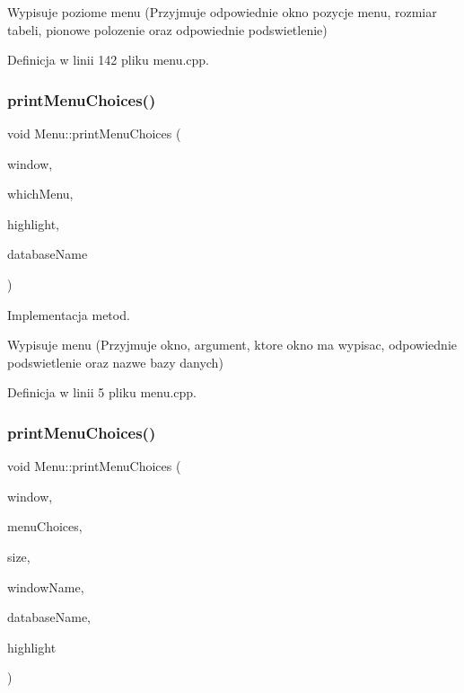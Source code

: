 Wypisuje poziome menu (Przyjmuje odpowiednie okno pozycje menu, rozmiar tabeli, pionowe polozenie oraz odpowiednie podswietlenie) 

Definicja w linii 142 pliku menu.\+cpp.

\mbox{\label{class_menu_ad413f4b72438f65886bc5f5e370ad426}} 
\subsubsection{\texorpdfstring{print\+Menu\+Choices()}{printMenuChoices()}\hspace{0.1cm}{\footnotesize\ttfamily [1/2]}}
{\footnotesize\ttfamily void Menu\+::print\+Menu\+Choices (\begin{DoxyParamCaption}\item[{W\+I\+N\+D\+OW $\ast$}]{window,  }\item[{Choices\+::choices\+\_\+t}]{which\+Menu,  }\item[{unsigned int}]{highlight,  }\item[{std\+::string}]{database\+Name }\end{DoxyParamCaption})\hspace{0.3cm}{\ttfamily [static]}}



Implementacja metod. 

Wypisuje menu (Przyjmuje okno, argument, ktore okno ma wypisac, odpowiednie podswietlenie oraz nazwe bazy danych) 

Definicja w linii 5 pliku menu.\+cpp.

\mbox{\label{class_menu_a5faa9cd8e2be7ef81916032c64a1d460}} 
\subsubsection{\texorpdfstring{print\+Menu\+Choices()}{printMenuChoices()}\hspace{0.1cm}{\footnotesize\ttfamily [2/2]}}
{\footnotesize\ttfamily void Menu\+::print\+Menu\+Choices (\begin{DoxyParamCaption}\item[{W\+I\+N\+D\+OW $\ast$}]{window,  }\item[{const std\+::string $\ast$}]{menu\+Choices,  }\item[{unsigned int}]{size,  }\item[{std\+::string}]{window\+Name,  }\item[{std\+::string}]{database\+Name,  }\item[{unsigned int}]{highlight }\end{DoxyParamCaption})\hspace{0.3cm}{\ttfamily [static]}}

